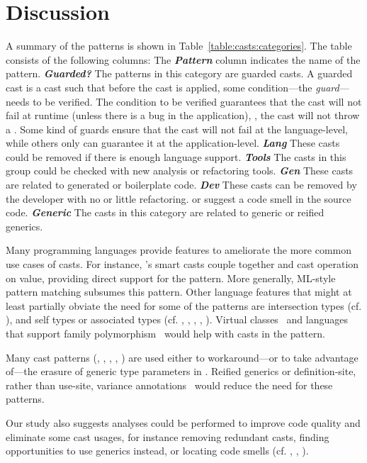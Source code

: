 \section{Discussion}
\label{sec:casts:discussion}

A summary of the patterns is shown in Table~\ref{table:casts:categories}.
The table consists of the following columns:
\newcommand{\gh}[1]{\emph{\textbf{#1}}}
The \gh{Pattern} column indicates the name of the pattern.
\gh{Guarded?} The patterns in this category are guarded casts.
A guarded cast is a cast such that before the cast is applied,
some condition---the \emph{guard}---needs to be verified.
The condition to be verified guarantees that the cast will not fail at runtime (unless there is a bug in the application), \ie,
the cast will not throw a .
Some kind of guards ensure that the cast will not fail at the language-level,
while others only can guarantee it at the application-level.
\gh{Lang} These casts could be removed if there is enough language support.
\gh{Tools} The casts in this group could be checked with new analysis or refactoring tools.
\gh{Gen} These casts are related to generated or boilerplate code.
\gh{Dev} These casts can be removed by the developer with no or little refactoring.
or suggest a code smell in the source code.
\gh{Generic} The casts in this category are related to generic or reified generics.



Many programming languages provide features to ameliorate the more common use cases of casts.
For instance,
\kotlin{}'s smart casts couple together  and cast operation on value, 
providing direct support for the  pattern.
More generally, ML-style pattern matching subsumes this pattern.
Other language features that might at least partially obviate the need for some of the patterns are
intersection types (cf. ),
and
self types or associated types (cf. 
,
,
,
,
).
Virtual classes~\cite{gbeta, scalaIndependentlyExtensible} and languages that support
family polymorphism~\cite{ernstFamilyPolymorphism2001}
would help with casts in the  pattern.

Many cast patterns (\eg, 
,
,
,
)
are used either to 
workaround---or to take advantage of---the erasure of generic type parameters in \java{}.
Reified generics or definition-site, rather than use-site, variance annotations~\cite{altidorTamingWildcardsCombining2011}
would reduce the need for these patterns.

Our study also suggests analyses could be performed to improve code quality and eliminate some cast usages,
for instance removing redundant casts,
finding opportunities to use generics instead,
or locating code smells (cf.
,
,
).